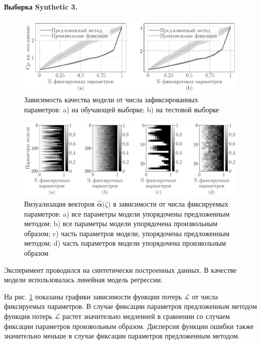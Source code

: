 \paragraph{Выборка Synthetic 3.}
\begin{figure}[h!t]\center
\includegraphics[width=1\textwidth]{results/order/generate_data_linear_loss}
\caption{Зависимость качества модели от числа зафиксированных параметров: a) на обучающей выборке; b) на тестовой выборке}
\label{ch-5:fg:ex:syn1:1}
\end{figure}

\begin{figure}[h!t]\center
\includegraphics[width=1\textwidth]{results/order/generate_data_linear_matshow}
\caption{Визуализация векторов $\hat{\bm{\alpha}}\bigr(\zeta\bigr)$ в зависимости от числа фиксируемых параметров: a) все параметры модели упорядочены предложенным методом; b) все параметры модели упорядочена произвольным образом; c) часть параметров модели, упорядочены предложенным методом; d) часть параметров модели упорядочена произвольным образом}
\label{ch-5:fg:ex:syn1:2}
\end{figure}

Эксперимент проводился на синтетически построенных данных. В качестве модели использовалась линейная модель регрессии.

На рис. \ref{ch-5:fg:ex:syn1:1} показаны графики зависимости функции потерь $\mathcal{L}$ от числа фиксируемых параметров. В случае фиксации параметров предложенным методом функция потерь $\mathcal{L}$ растет значительно медленней в сравнении со случаем фиксации параметров произвольным образом. Дисперсия функции ошибки также значительно меньше в случае фиксации параметров предложенным методом.

